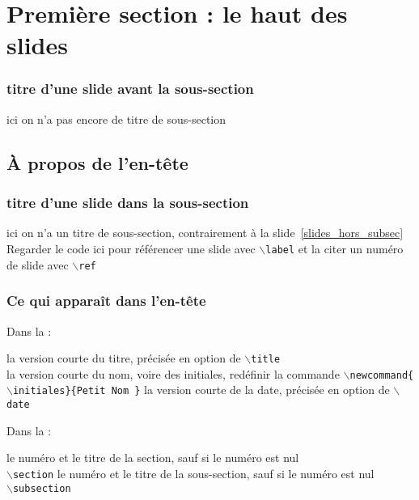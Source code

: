 \section[Première section]{Première section : le haut des slides}
\begin{frame}
\frametitle{titre d'une slide avant la sous-section\esp}
ici on n'a pas encore de titre de sous-section
\label{slides_hors_subsec}
\end{frame}


\subsection{À propos de l'en-tête}
\begin{frame}
\frametitle{titre d'une slide dans la sous-section\esp}
ici on n'a un titre de sous-section, contrairement à la slide~\ref{slides_hors_subsec}\\[2cm]
Regarder le code ici pour référencer une slide avec \texttt{$\backslash$label} et la citer un numéro de slide avec  \texttt{$\backslash$ref}
\end{frame}


\begin{frame}
\frametitle{Ce qui apparaît dans l'en-tête}

Dans la :
\begin{itemize}
\flch la version courte du titre, précisée en option  de  \texttt{$\backslash$title}\\
\flch la version courte du nom, voire des initiales, redéfinir la commande
\texttt{$\backslash$newcommand\{$\backslash$initiales\}\{Petit Nom \}} 
\flch la version courte de la date, précisée en option de \texttt{$\backslash$date}\\
\end{itemize}
\bigskip
Dans la :
\begin{itemize}
\flch le numéro et le titre de la section, sauf si le numéro est nul\\
 \texttt{$\backslash$section}
\flch le numéro et le titre de la sous-section, sauf si le numéro est nul\\
 \texttt{$\backslash$subsection}
\end{itemize}

\end{frame}


